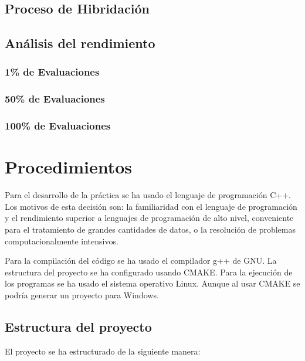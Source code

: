 \documentclass[a4paper, 12.5pt]{report}
\begin{document}
\subsection{Proceso de Hibridación}

\subsection{Análisis del rendimiento}

\subsubsection{1\% de Evaluaciones}

\subsubsection{50\% de Evaluaciones}

\subsubsection{100\% de Evaluaciones}


\section{Procedimientos}

Para el desarrollo de la práctica se ha usado el lenguaje de programación C++. Los motivos de esta decisión son: la familiaridad con el lenguaje de programación y el rendimiento superior a lenguajes de programación de alto nivel, conveniente para el tratamiento de grandes cantidades de datos, o la resolución de problemas computacionalmente intensivos.

Para la compilación del código se ha usado el compilador g++ de GNU. La estructura del proyecto se ha configurado usando CMAKE. Para la ejecución de los programas se ha usado el sistema operativo Linux. Aunque al usar CMAKE se podría generar un proyecto para Windows.

\newpage

\subsection{Estructura del proyecto}

El proyecto se ha estructurado de la siguiente manera:
\end{document}
